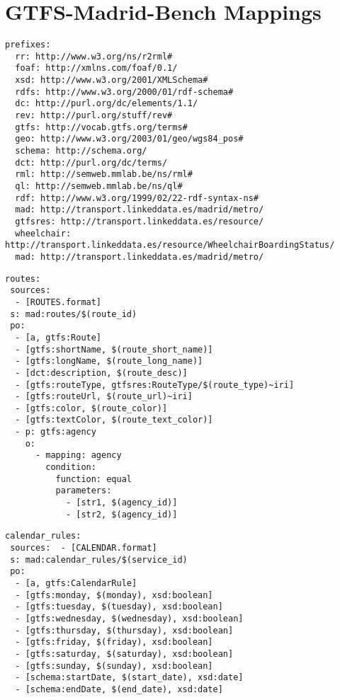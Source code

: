 \chapter{GTFS-Madrid-Bench Mappings}
\label{sec:appendix2}


\begin{lstlisting}[caption=Prefixes, label=lst:prefixes2, basicstyle=\small,frame=single]
prefixes:
  rr: http://www.w3.org/ns/r2rml#
  foaf: http://xmlns.com/foaf/0.1/
  xsd: http://www.w3.org/2001/XMLSchema#
  rdfs: http://www.w3.org/2000/01/rdf-schema#
  dc: http://purl.org/dc/elements/1.1/
  rev: http://purl.org/stuff/rev#
  gtfs: http://vocab.gtfs.org/terms#
  geo: http://www.w3.org/2003/01/geo/wgs84_pos#
  schema: http://schema.org/
  dct: http://purl.org/dc/terms/
  rml: http://semweb.mmlab.be/ns/rml#
  ql: http://semweb.mmlab.be/ns/ql#
  rdf: http://www.w3.org/1999/02/22-rdf-syntax-ns#
  mad: http://transport.linkeddata.es/madrid/metro/
  gtfsres: http://transport.linkeddata.es/resource/
  wheelchair: http://transport.linkeddata.es/resource/WheelchairBoardingStatus/
  mad: http://transport.linkeddata.es/madrid/metro/

\end{lstlisting}
\begin{lstlisting}[caption=Routes TripleMap, label=lst:routes, basicstyle=\small,frame=single]
routes:
 sources:
  - [ROUTES.format]
 s: mad:routes/$(route_id)
 po:
  - [a, gtfs:Route]
  - [gtfs:shortName, $(route_short_name)]
  - [gtfs:longName, $(route_long_name)]
  - [dct:description, $(route_desc)]
  - [gtfs:routeType, gtfsres:RouteType/$(route_type)~iri]
  - [gtfs:routeUrl, $(route_url)~iri]
  - [gtfs:color, $(route_color)]
  - [gtfs:textColor, $(route_text_color)]
  - p: gtfs:agency
    o:
      - mapping: agency
        condition:
          function: equal
          parameters:
            - [str1, $(agency_id)]
            - [str2, $(agency_id)]
\end{lstlisting}
\begin{lstlisting}[caption=Calendar\_Date TripleMap, label=lst:calendarDate, basicstyle=\small,frame=single]
calendar_rules:
 sources:  - [CALENDAR.format]
 s: mad:calendar_rules/$(service_id)
 po:
  - [a, gtfs:CalendarRule]
  - [gtfs:monday, $(monday), xsd:boolean]
  - [gtfs:tuesday, $(tuesday), xsd:boolean]
  - [gtfs:wednesday, $(wednesday), xsd:boolean]
  - [gtfs:thursday, $(thursday), xsd:boolean]
  - [gtfs:friday, $(friday), xsd:boolean]
  - [gtfs:saturday, $(saturday), xsd:boolean]
  - [gtfs:sunday, $(sunday), xsd:boolean]
  - [schema:startDate, $(start_date), xsd:date]
  - [schema:endDate, $(end_date), xsd:date]
\end{lstlisting}


